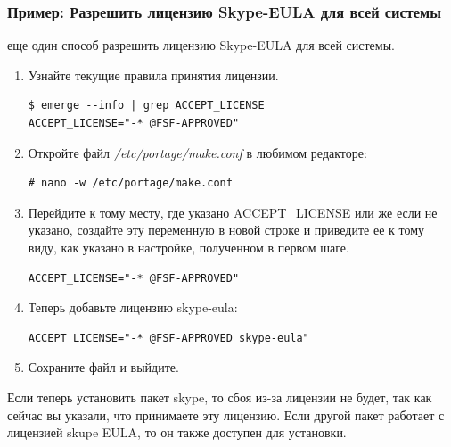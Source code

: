 \documentclass[10pt]{book}
\begin{document}
\subsubsection{Пример: Разрешить лицензию Skype-EULA для всей системы}
еще один способ разрешить лицензию Skype-EULA для всей системы.

\begin{enumerate}
 \item Узнайте текущие правила принятия лицензии.
 \begin{tcolorbox}
\begin{lstlisting}
$ emerge --info | grep ACCEPT_LICENSE
ACCEPT_LICENSE="-* @FSF-APPROVED"
\end{lstlisting}
\end{tcolorbox}
\item Откройте файл \textit{/etc/portage/make.conf} в любимом редакторе:
 \begin{tcolorbox}
\begin{lstlisting}
# nano -w /etc/portage/make.conf
\end{lstlisting}
\end{tcolorbox}
\item Перейдите к тому месту, где указано ACCEPT\_LICENSE или же если не указано, создайте эту переменную в новой строке и приведите ее к тому виду, как указано в настройке, полученном в первом шаге.
 \begin{tcolorbox}
\begin{lstlisting}
ACCEPT_LICENSE="-* @FSF-APPROVED"
\end{lstlisting}
\end{tcolorbox}
\item Теперь добавьте лицензию skype-eula:
 \begin{tcolorbox}
\begin{lstlisting}
ACCEPT_LICENSE="-* @FSF-APPROVED skype-eula"
\end{lstlisting}
\end{tcolorbox}
\item Сохраните файл и выйдите.
\end{enumerate}

Если теперь установить пакет skype, то сбоя из-за лицензии не будет, так как сейчас вы указали, что принимаете эту лицензию. Если другой пакет работает с лицензией skupe EULA, то он также доступен для установки.
\end{document}
